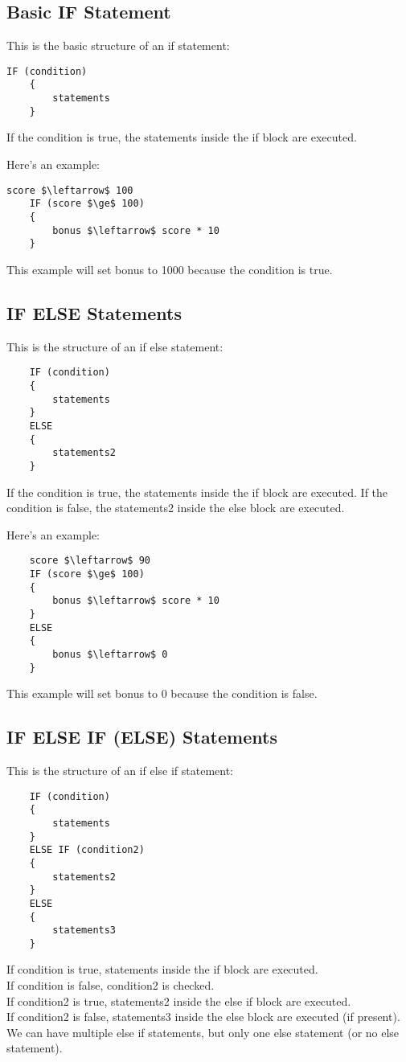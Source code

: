 \documentclass{article}
\begin{document}
\subsection*{Basic IF Statement}

This is the basic structure of an if statement:
\begin{lstlisting}[mathescape=true]
    IF (condition)
    {
        statements
    }
\end{lstlisting}
If the condition is true, the statements inside the if block are executed.

Here's an example:
\begin{lstlisting}[mathescape=true]
    score $\leftarrow$ 100
    IF (score $\ge$ 100)
    {
        bonus $\leftarrow$ score * 10
    }
\end{lstlisting}
This example will set bonus to 1000 because the condition is true.


\subsection*{IF ELSE Statements}

This is the structure of an if else statement:
\begin{lstlisting}
    IF (condition)
    {
        statements
    }
    ELSE
    {
        statements2
    }
\end{lstlisting}

If the condition is true, the statements inside the if block are executed.
If the condition is false, the statements2 inside the else block are executed.

Here's an example:
\begin{lstlisting}
    score $\leftarrow$ 90
    IF (score $\ge$ 100)
    {
        bonus $\leftarrow$ score * 10
    }
    ELSE
    {
        bonus $\leftarrow$ 0
    }
\end{lstlisting}

This example will set bonus to 0 because the condition is false.

\subsection*{IF ELSE IF (ELSE) Statements}

This is the structure of an if else if statement:
\begin{lstlisting}
    IF (condition)
    {
        statements
    }
    ELSE IF (condition2)
    {
        statements2
    }
    ELSE
    {
        statements3
    }
\end{lstlisting}
If condition is true, statements inside the if block are executed.\\
If condition is false, condition2 is checked.\\
If condition2 is true, statements2 inside the else if block are executed.\\
If condition2 is false, statements3 inside the else block are executed (if present).\\
We can have multiple else if statements, but only one else statement (or no else statement).
\end{document}
